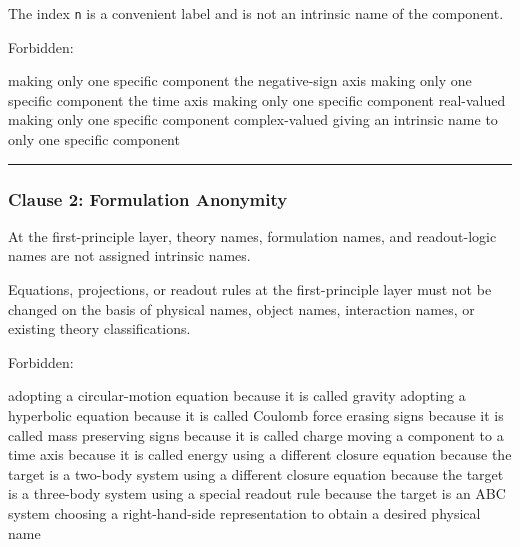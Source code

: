 \documentclass[
  a4paper,
]{article}
\newenvironment{Shaded}{}{}
\newcommand{\NormalTok}[1]{#1}
\begin{document}
The index \texttt{n} is a convenient label and is not an intrinsic name
of the component.

Forbidden:

\begin{Shaded}
\begin{Highlighting}[]
\NormalTok{making only one specific component the negative{-}sign axis}
\NormalTok{making only one specific component the time axis}
\NormalTok{making only one specific component real{-}valued}
\NormalTok{making only one specific component complex{-}valued}
\NormalTok{giving an intrinsic name to only one specific component}
\end{Highlighting}
\end{Shaded}

\begin{center}\rule{0.5\linewidth}{0.5pt}\end{center}

\subsubsection{Clause 2: Formulation
Anonymity}\label{clause-2-formulation-anonymity}

At the first-principle layer, theory names, formulation names, and
readout-logic names are not assigned intrinsic names.

Equations, projections, or readout rules at the first-principle layer
must not be changed on the basis of physical names, object names,
interaction names, or existing theory classifications.

Forbidden:

\begin{Shaded}
\begin{Highlighting}[]
\NormalTok{adopting a circular{-}motion equation because it is called gravity}
\NormalTok{adopting a hyperbolic equation because it is called Coulomb force}
\NormalTok{erasing signs because it is called mass}
\NormalTok{preserving signs because it is called charge}
\NormalTok{moving a component to a time axis because it is called energy}
\NormalTok{using a different closure equation because the target is a two{-}body system}
\NormalTok{using a different closure equation because the target is a three{-}body system}
\NormalTok{using a special readout rule because the target is an ABC system}
\NormalTok{choosing a right{-}hand{-}side representation to obtain a desired physical name}
\end{Highlighting}
\end{Shaded}
\end{document}
